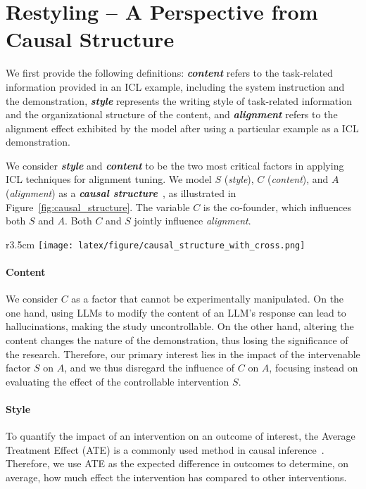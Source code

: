 \section{Restyling – A Perspective from Causal Structure}
\label{append:causality}
We first provide the following definitions: \textit{\textbf{content}} refers to the task-related information provided in an ICL example, including the system instruction and the demonstration, \textit{\textbf{style}} represents the writing style of task-related information and the organizational structure of the content, and \textit{\textbf{alignment}} refers to the alignment effect exhibited by the model after using a particular example as a ICL demonstration.

We consider \textit{\textbf{style}} and \textit{\textbf{content}} to be the two most critical factors in applying ICL techniques for alignment tuning. 
We model $S$ (\textit{style}), $C$ (\textit{content}), and $A$ (\textit{alignment}) as a \textit{\textbf{causal structure}}~\citep{pearl2009causality}, as illustrated in Figure~\ref{fig:causal_structure}. 
The variable $C$ is the co-founder, which influences both $S$ and $A$. Both $C$ and $S$ jointly influence \textit{alignment}.

\begin{wrapfigure}{r}{3.5cm}
    \centering
    \vspace{-17pt}
    \texttt{[image: latex/figure/causal\_structure\_with\_cross.png]}
    \caption{The causal structure of style, content, and alignment.}
    \vspace{-10pt}
    \label{fig:causal_structure}
\end{wrapfigure}

\paragraph{Content}
We consider $C$ as a factor that cannot be experimentally manipulated. 
On the one hand, using LLMs to modify the content of an LLM’s response can lead to hallucinations, making the study uncontrollable. 
On the other hand, altering the content changes the nature of the demonstration, thus losing the significance of the research. 
Therefore, our primary interest lies in the impact of the intervenable factor $S$ on $A$, and we thus disregard the influence of $C$ on $A$, focusing instead on evaluating the effect of the controllable intervention $S$.

\paragraph{Style}
To quantify the impact of an intervention on an outcome of interest, the Average Treatment Effect (ATE) is a commonly used method in causal inference~\citep{kaddour2021causal,DBLP:conf/iclr/MahajanMNS24}.
Therefore, we use ATE as the expected difference in outcomes to determine, on average, how much effect the intervention has compared to other interventions.

